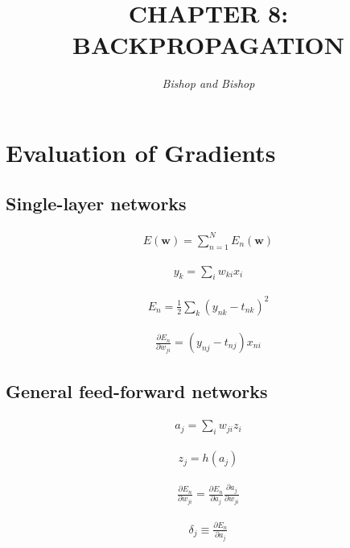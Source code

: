 \documentclass{article}
\title{\LARGE\scshape\MakeUppercase{Chapter 8: Backpropagation}}
\author{\textit{Bishop and Bishop}}
\date{}
\begin{document}
\maketitle

\section{Evaluation of Gradients}

\subsection{Single-layer networks}

\begin{align*}
E(\mathbf{w}) = \sum_{n=1}^{N} E_{n}(\mathbf{w}) \tag{8.1}
\end{align*}

\begin{align*}
y_{k} = \sum_{i} w_{k i} x_{i} \tag{8.2}
\end{align*}

\begin{align*}
E_{n} = \frac{1}{2} \sum_{k} \left( y_{n k} - t_{n k} \right)^{2} \tag{8.3}
\end{align*}

\begin{align*}
\frac{\partial E_{n}}{\partial w_{j i}} = \left( y_{n j} - t_{n j} \right) x_{n i} \tag{8.4}
\end{align*}

\subsection{General feed-forward networks}

\begin{align*}
a_{j} = \sum_{i} w_{j i} z_{i} \tag{8.5}
\end{align*}

\begin{align*}
z_{j} = h(a_{j}) \tag{8.6}
\end{align*}

\begin{align*}
\frac{\partial E_{n}}{\partial w_{j i}} = \frac{\partial E_{n}}{\partial a_{j}} \frac{\partial a_{j}}{\partial w_{j i}} \tag{8.7}
\end{align*}

\begin{align*}
\delta_{j} \equiv \frac{\partial E_{n}}{\partial a_{j}} \tag{8.8}
\end{align*}
\end{document}
